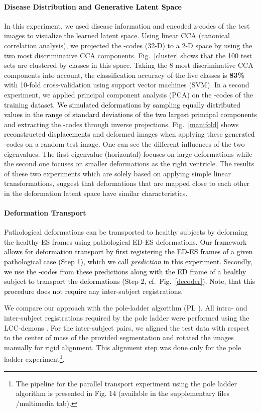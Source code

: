 \documentclass[journal]{IEEEtran}
\newcommand{\update}[1]{\textcolor{black}{#1}}
\begin{document}
\paragraph{Disease Distribution and \update{Generative Latent Space}} In this experiment, we used disease information and encoded z-codes of the test images to visualize \update{the} learned latent space. Using linear CCA (canonical correlation analysis), we projected the -codes (32-D) to a 2-D space by using the two most discriminative CCA components. Fig.~\ref{cluster} shows that the 100 test sets are clustered by classes in this space. Taking the 8 most discriminative CCA components into account, the classification accuracy of the five classes is \textbf{83\%} with 10-fold cross-validation using support vector machines (SVM). 
In a second experiment, we applied principal component analysis (PCA) on the -codes of the \update{training dataset. We simulated deformations by sampling equally distributed values in the range of  standard deviations of the two largest principal components} and extracting the -codes through inverse projections. Fig.~\ref{manifold} shows \update{reconstructed displacements} and deformed images when applying these \update{generated} -codes on a random test image. One can see the different influences of the two eigenvalues. The first eigenvalue (horizontal) focuses on large deformations while the second one focuses on smaller deformations as the right ventricle. The results of these two experiments which are solely based on applying simple linear transformations, suggest that deformations that are mapped close to each other in the deformation latent space have similar characteristics.

\paragraph{Deformation Transport}
Pathological deformations can be transported to healthy subjects by deforming the healthy ES frames using pathological ED-ES deformations\update{. Our framework allows for deformation transport by first registering the ED-ES frames of a given pathological case (Step 1), which we call \emph{prediction} in this experiment. Secondly, we use the -codes from these predictions along with the ED frame of a healthy subject to transport the deformations (Step 2, cf.\ Fig.~\ref{decoder}). Note, that this procedure does not require} any inter-subject registrations. 

We compare our approach with the pole-ladder algorithm (PL \cite{lorenzi2014efficient}). All intra- and inter-subject registrations required by the pole ladder were performed using the LCC-demons \cite{lorenzi2013lcc}. For the inter-subject pairs, we aligned the test data with respect to the center of mass of the provided segmentation and rotated the images manually for rigid alignment. This alignment step was done only for the pole ladder experiment\update{\footnote{The pipeline for the parallel transport experiment using the pole ladder algorithm is presented in Fig. 14 (available in the supplementary files /multimedia tab).}}. 
\end{document}
